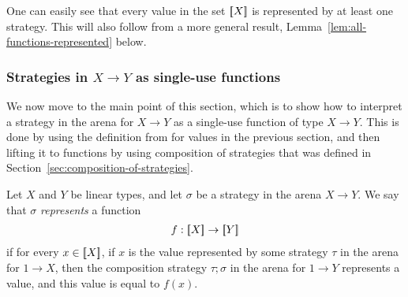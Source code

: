 One can easily see that every value in the set $[{\kern-0.45ex}[X]{\kern-0.45ex}]$ is represented by at least one strategy. This will also follow from a more general result, Lemma~\ref{lem:all-functions-represented} below.

\subsubsection{Strategies in $X \to Y$ as single-use functions}
We now move to the main point of this section, which is to show how to interpret a strategy in the arena for $X \to Y$ as a single-use function of type $X \to Y$. This is done by using the definition from for values in the previous section, and then lifting it to functions by using composition of strategies that was defined in Section~\ref{sec:composition-of-strategies}.


\begin{definition}\label{def:strategy-as-single-use-function}
    Let $X$ and $Y$ be linear types, and let $\sigma$ be a strategy in the arena $X \to Y$. We say that $\sigma$ \emph{represents} a function  
    \begin{align*}
    f : [{\kern-0.45ex}[X]{\kern-0.45ex}] \to [{\kern-0.45ex}[Y]{\kern-0.45ex}]
    \end{align*}
    if for every $x \in [{\kern-0.45ex}[X]{\kern-0.45ex}]$, if  $x$ is the value  represented by some strategy $\tau$ in the arena for $1 \to X$, then the composition strategy $\tau;\sigma$ in the arena for $1 \to Y$ represents a value, and this value is equal to $f(x)$.
\end{definition}

